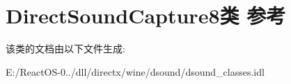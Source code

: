 \hypertarget{class_direct_sound_capture8}{}\section{Direct\+Sound\+Capture8类 参考}
\label{class_direct_sound_capture8}


该类的文档由以下文件生成\+:\begin{DoxyCompactItemize}
\item 
E\+:/\+React\+O\+S-\/0../dll/directx/wine/dsound/dsound\+\_\+classes.\+idl\end{DoxyCompactItemize}
